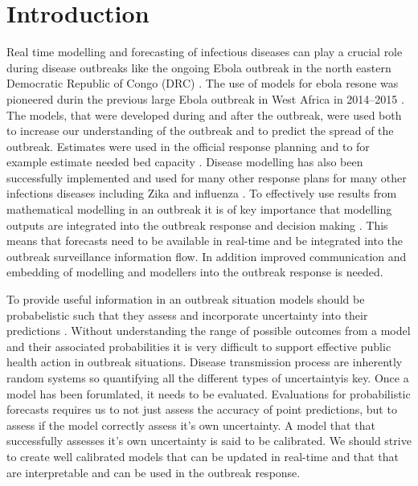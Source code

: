 \documentclass[12pt]{article}
\begin{document}
\newpage

\tableofcontents

\newpage

\section{Introduction}


Real time modelling and forecasting of infectious diseases can play a crucial role during disease outbreaks like the ongoing Ebola outbreak in the north eastern Democratic Republic of Congo (DRC) \cite{heesterbeekModelingInfectiousDisease2015,riversUsingOutbreakScience2019a}. The use of models for ebola resone was pioneered durin the previous large Ebola outbreak in West Africa in 2014--2015 \cite{chretienMathematicalModelingWest}. The models, that were developed during and after the outbreak, were used both to increase our understanding of the outbreak and to predict the spread of the outbreak. Estimates were used in the official response planning \cite{whoebolaresponseteamEbolaVirusDisease2014} and to for example estimate needed bed capacity \cite{camachoTemporalChangesEbola2015}. Disease modelling has also been successfully implemented and used for many other response plans for many other infections diseases including Zika \cite{kobresSystematicReviewEvaluation2019} and influenza \cite{chretienInfluenzaForecastingHuman2014}. To effectively use results from mathematical modelling in an outbreak it is of key importance that modelling outputs are integrated into the outbreak response and decision making \cite{riversUsingOutbreakScience2019a}. This means that forecasts need to be available in real-time and be integrated into the outbreak surveillance information flow. In addition improved communication and embedding of modelling and modellers into the outbreak response is needed. 

To provide useful information in an outbreak situation models should be probabelistic such that they assess and incorporate uncertainty into their predictions \cite{funkAssessingPerformanceRealtime2019, weiCalibrationTestsCount2014,gneitingEditorialProbabilisticForecasting2008}. Without understanding the range of possible outcomes from a model and their associated probabilities it is very difficult to support effective public health action in outbreak situations. Disease transmission process are inherently random systems so quantifying all the different types of uncertaintyis key. Once a model has been forumlated, it needs to be evaluated. Evaluations for probabilistic forecasts requires us to not just assess the accuracy of point predictions, but to assess if the model correctly assess it's own uncertainty\cite{gneitingProbabilisticForecastsCalibration2007, czadoPredictiveModelAssessment2009}. A model that that successfully assesses it's own uncertainty is said to be calibrated. We should strive to create well calibrated models that can be updated in real-time and that that are interpretable and can be used in the outbreak response. 
\end{document}
